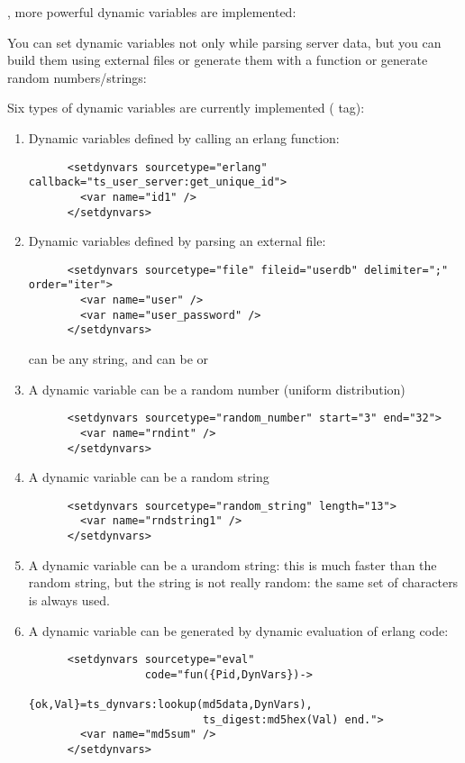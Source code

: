 \documentclass{TSUNG-en}
\begin{document}
, more powerful dynamic variables are implemented:

You can set dynamic variables not only while parsing server data, but
you can build them using external files or generate them with a function
or generate random numbers/strings:

Six types of dynamic variables are currently implemented ( tag):
\begin{enumerate}
\item Dynamic variables defined by calling an erlang function:
\begin{Verbatim}
      <setdynvars sourcetype="erlang" callback="ts_user_server:get_unique_id">
        <var name="id1" />
      </setdynvars>
\end{Verbatim}
\item Dynamic variables defined by parsing an external file:
\begin{Verbatim}
      <setdynvars sourcetype="file" fileid="userdb" delimiter=";" order="iter">
        <var name="user" />
        <var name="user_password" />
      </setdynvars>
\end{Verbatim}
 can be any string, and  can be
 or 
\item A dynamic variable can be a random number (uniform distribution)
\begin{Verbatim}
      <setdynvars sourcetype="random_number" start="3" end="32">
        <var name="rndint" />
      </setdynvars>
\end{Verbatim}
\item A dynamic variable can be a random string
\begin{Verbatim}
      <setdynvars sourcetype="random_string" length="13">
        <var name="rndstring1" />
      </setdynvars>
\end{Verbatim}
\item A dynamic variable can be a urandom string: this is much faster than
  the random string, but the string is not really random: the same set
  of characters is always used.
\item A dynamic variable can be generated by dynamic evaluation of
  erlang code:
\begin{Verbatim}
      <setdynvars sourcetype="eval"
                  code="fun({Pid,DynVars})->
                           {ok,Val}=ts_dynvars:lookup(md5data,DynVars),
                           ts_digest:md5hex(Val) end.">
        <var name="md5sum" />
      </setdynvars>
\end{Verbatim}

\end{enumerate}
\end{document}
